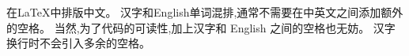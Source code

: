\documentclass{ctexart}
\begin{document}
在\LaTeX{}中排版中文。
汉字和English单词混排,通常不需要在中英文之间添加额外的空格。
当然,为了代码的可读性,加上汉字和 English 之间的空格也无妨。
汉字换行时不会引入多余的空格。
\end{document}
